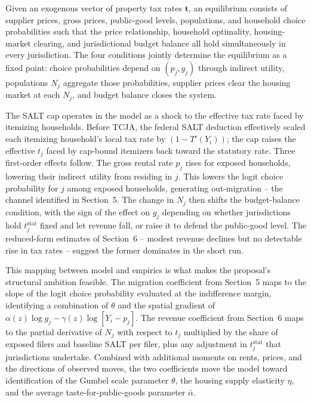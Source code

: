 \documentclass[12pt]{article}
\begin{document}
Given an exogenous vector of property tax rates $\mathbf{t}$, an equilibrium consists of supplier prices, gross prices, public-good levels, populations, and household choice probabilities such that the price relationship, household optimality, housing-market clearing, and jurisdictional budget balance all hold simultaneously in every jurisdiction. The four conditions jointly determine the equilibrium as a fixed point: choice probabilities depend on $(p_j, g_j)$ through indirect utility, populations $N_j$ aggregate those probabilities, supplier prices clear the housing market at each $N_j$, and budget balance closes the system.

The SALT cap operates in the model as a shock to the effective tax rate faced by itemizing households. Before TCJA, the federal SALT deduction effectively scaled each itemizing household's local tax rate by $(1 - T'(Y_i))$; the cap raises the effective $t_j$ faced by cap-bound itemizers back toward the statutory rate. Three first-order effects follow. The gross rental rate $p_j$ rises for exposed households, lowering their indirect utility from residing in $j$. This lowers the logit choice probability for $j$ among exposed households, generating out-migration -- the channel identified in Section~5. The change in $N_j$ then shifts the budget-balance condition, with the sign of the effect on $g_j$ depending on whether jurisdictions hold $t^{\text{stat}}_j$ fixed and let revenue fall, or raise it to defend the public-good level. The reduced-form estimates of Section~6 -- modest revenue declines but no detectable rise in tax rates -- suggest the former dominates in the short run.

This mapping between model and empirics is what makes the proposal's structural ambition feasible. The migration coefficient from Section~5 maps to the slope of the logit choice probability evaluated at the indifference margin, identifying a combination of $\theta$ and the spatial gradient of $\alpha(z) \log g_j - \gamma(z) \log[Y_i - p_j]$. The revenue coefficient from Section~6 maps to the partial derivative of $N_j$ with respect to $t_j$ multiplied by the share of exposed filers and baseline SALT per filer, plus any adjustment in $t^{\text{stat}}_j$ that jurisdictions undertake. Combined with additional moments on rents, prices, and the directions of observed moves, the two coefficients move the model toward identification of the Gumbel scale parameter $\theta$, the housing supply elasticity $\eta$, and the average taste-for-public-goods parameter $\bar\alpha$.
\end{document}
